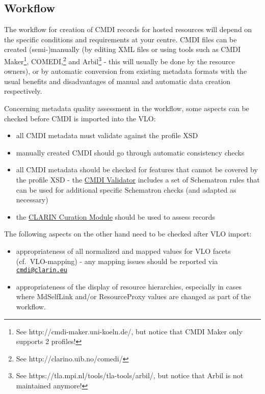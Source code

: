 \subsection{Workflow}\label{authoring-workflow}

The workflow for creation of CMDI records for hosted resources will depend on the specific conditions and requirements at your centre. CMDI files can be created (semi-)manually (by editing XML files or using tools such as CMDI Maker\footnote{See http://cmdi-maker.uni-koeln.de/, but notice that CMDI Maker only supports 2 profiles!}, COMEDI,\footnote{See http://clarino.uib.no/comedi/} and Arbil\footnote{See
https://tla.mpi.nl/tools/tla-tools/arbil/, but notice that Arbil is not maintained anymore!} - this will usually be done by the resource owners), or by automatic conversion from existing metadata formats with the usual benefits and disadvantages of manual and automatic data creation respectively.

Concerning metadata quality assessment in the workflow, some aspects can be checked before CMDI is imported into the VLO:

\begin{itemize}
\tightlist
\item
  all CMDI metadata must validate against the profile XSD
\item
  manually created CMDI should go through automatic consistency checks
\item
  all CMDI metadata should be checked for features that cannot be   covered by the profile XSD - the
  \href{https://github.com/clarin-eric/cmdi-instance-validator/releases/latest}{CMDI Validator} includes a set of Schematron rules that can be used for   additional specific Schematron checks (and adapted as necessary)
\item
  the \href{https://clarin.oeaw.ac.at/curate/}{CLARIN Curation Module}   should be used to assess records
\end{itemize}

The following aspects on the other hand need to be checked after VLO import:

\begin{itemize}
\tightlist
\item
  appropriateness of all normalized and mapped values for VLO facets (cf.~VLO-mapping) - any mapping issues should be reported via \href{mailto:cmdi@clarin.eu}{\nolinkurl{cmdi@clarin.eu}}
\item
  appropriateness of the display of resource hierarchies, especially in cases where MdSelfLink and/or ResourceProxy values are changed as part of the workflow.
\end{itemize}
